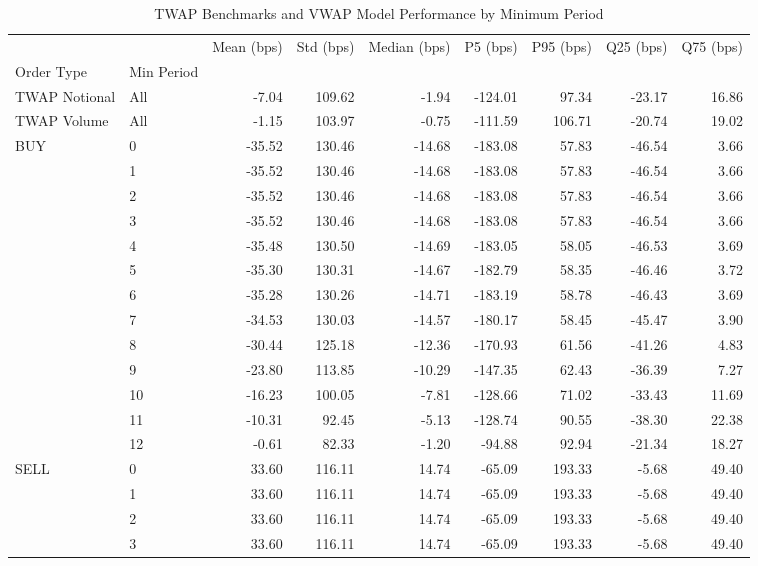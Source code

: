 \begin{table}
\caption{TWAP Benchmarks and VWAP Model Performance by Minimum Period}
\label{tab:comprehensive_performance}
\begin{tabular}{l|l|rrrrrrr}
\toprule
 &  & Mean (bps) & Std (bps) & Median (bps) & P5 (bps) & P95 (bps) & Q25 (bps) & Q75 (bps) \\
Order Type & Min Period &  &  &  &  &  &  &  \\
\midrule
TWAP Notional & All & -7.04 & 109.62 & -1.94 & -124.01 & 97.34 & -23.17 & 16.86 \\
\cline{1-9}
TWAP Volume & All & -1.15 & 103.97 & -0.75 & -111.59 & 106.71 & -20.74 & 19.02 \\
\cline{1-9}
\multirow[t]{13}{*}{BUY} & 0 & -35.52 & 130.46 & -14.68 & -183.08 & 57.83 & -46.54 & 3.66 \\
 & 1 & -35.52 & 130.46 & -14.68 & -183.08 & 57.83 & -46.54 & 3.66 \\
 & 2 & -35.52 & 130.46 & -14.68 & -183.08 & 57.83 & -46.54 & 3.66 \\
 & 3 & -35.52 & 130.46 & -14.68 & -183.08 & 57.83 & -46.54 & 3.66 \\
 & 4 & -35.48 & 130.50 & -14.69 & -183.05 & 58.05 & -46.53 & 3.69 \\
 & 5 & -35.30 & 130.31 & -14.67 & -182.79 & 58.35 & -46.46 & 3.72 \\
 & 6 & -35.28 & 130.26 & -14.71 & -183.19 & 58.78 & -46.43 & 3.69 \\
 & 7 & -34.53 & 130.03 & -14.57 & -180.17 & 58.45 & -45.47 & 3.90 \\
 & 8 & -30.44 & 125.18 & -12.36 & -170.93 & 61.56 & -41.26 & 4.83 \\
 & 9 & -23.80 & 113.85 & -10.29 & -147.35 & 62.43 & -36.39 & 7.27 \\
 & 10 & -16.23 & 100.05 & -7.81 & -128.66 & 71.02 & -33.43 & 11.69 \\
 & 11 & -10.31 & 92.45 & -5.13 & -128.74 & 90.55 & -38.30 & 22.38 \\
 & 12 & -0.61 & 82.33 & -1.20 & -94.88 & 92.94 & -21.34 & 18.27 \\
\cline{1-9}
\multirow[t]{13}{*}{SELL} & 0 & 33.60 & 116.11 & 14.74 & -65.09 & 193.33 & -5.68 & 49.40 \\
 & 1 & 33.60 & 116.11 & 14.74 & -65.09 & 193.33 & -5.68 & 49.40 \\
 & 2 & 33.60 & 116.11 & 14.74 & -65.09 & 193.33 & -5.68 & 49.40 \\
 & 3 & 33.60 & 116.11 & 14.74 & -65.09 & 193.33 & -5.68 & 49.40 \\

\end{tabular}
\end{table}
